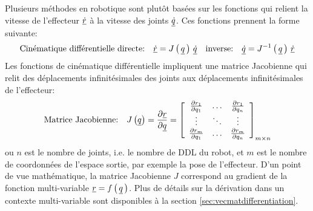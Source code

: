 Plusieurs méthodes en robotique sont plutôt basées sur les fonctions qui relient la vitesse de l'effecteur $\underline{\dot{r}}$ à la vitesse des joints $\underline{\dot{q}}$. Ces fonctions prennent la forme suivante:
\begin{equation}
\text{Cinématique différentielle directe:} \quad \underline{\dot{r}} = J\left( \, \underline{q} \, \right) \, \underline{\dot{q}}   \quad \text{inverse:} \quad \underline{\dot{q}} = J^{-1}\left( \, \underline{q} \, \right) \, \underline{\dot{r}}
\label{eq:diffkinrel}
\end{equation}
Les fonctions de cinématique différentielle impliquent une matrice Jacobienne qui relit des déplacements infinitésimales des joints aux déplacements infinitésimales de l'effecteur:
\begin{equation}
\text{Matrice Jacobienne:} \quad J\left( \underline{q} \right) = \frac{\partial \underline{r}}{\partial \underline{q}} = 
\left[ \begin{array}{c c c} 
\frac{\partial r_1 }{\partial q_1}   &  \hdots & \frac{\partial r_1 }{\partial q_n} \\ 
\vdots                               &  \ddots & \vdots                             \\
\frac{\partial r_m }{\partial q_1}   &  \hdots & \frac{\partial r_m }{\partial q_n}
\end{array} \right]_{m \times n}
\label{eq:matricejaco}
\end{equation}
ou $n$ est le nombre de joints, i.e. le nombre de DDL du robot, et $m$ est le nombre de coordonnées de l'espace sortie, par exemple la pose de l'effecteur.  D'un point de vue mathématique, la matrice Jacobienne $J$ correspond au gradient de la fonction multi-variable $\underline{r} = f\left( \, \underline{q} \, \right)$. Plus de détails sur la dérivation dans un contexte multi-variable sont disponibles à la section \ref{sec:vecmatdifferentiation}.

